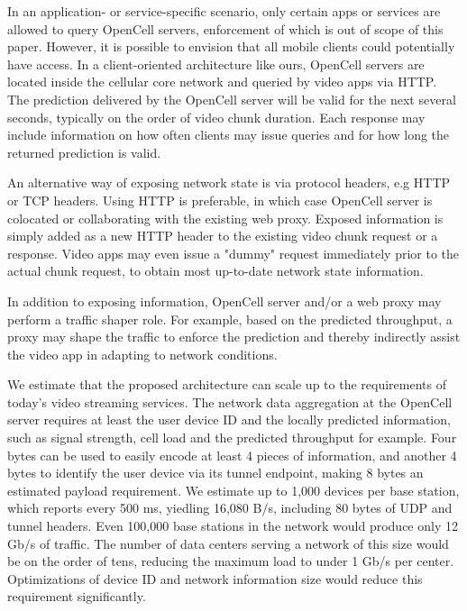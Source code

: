 In an application- or service-specific scenario, only certain apps or services are allowed to query OpenCell servers, enforcement of which is out of scope of this paper. However, it is possible to envision that all mobile clients could potentially have access. In a client-oriented architecture like ours, OpenCell servers are located inside the cellular core network and queried by video apps via HTTP. The prediction delivered by the OpenCell server will be valid for the next several seconds, typically on the order of video chunk duration. Each response may include information on how often clients may issue queries and for how long the returned prediction is valid.

An alternative way of exposing network state is via protocol headers, e.g HTTP or TCP headers. Using HTTP is preferable, in which case OpenCell server is colocated or collaborating with the existing web proxy. Exposed information is simply added as a new HTTP header to the existing video chunk request or a response. Video apps may even issue a "dummy" request immediately prior to the actual chunk request, to obtain most up-to-date network state information.

In addition to exposing information, OpenCell server and/or a web proxy may perform a traffic shaper role. For example, based on the predicted throughput, a proxy may shape the traffic to enforce the prediction and thereby indirectly assist the video app in adapting to network conditions. 

We estimate that the proposed architecture can scale up to the requirements of today's video streaming services. The network data aggregation at the OpenCell server requires at least the user device ID and the locally predicted information, such as signal strength, cell load and the predicted throughput for example. Four bytes can be used to easily encode at least 4 pieces of information, and another 4 bytes to identify the user device via its tunnel endpoint, making 8 bytes an estimated payload requirement. We estimate up to 1,000 devices per base station, which reports every 500 ms, yiedling 16,080 B/s, including 80 bytes of UDP and tunnel headers. Even 100,000 base stations in the network would produce only 12 Gb/s of traffic. The number of data centers serving a network of this size would be on the order of tens, reducing the maximum load to under 1 Gb/s per center. Optimizations of device ID and network information size would reduce this requirement significantly.










